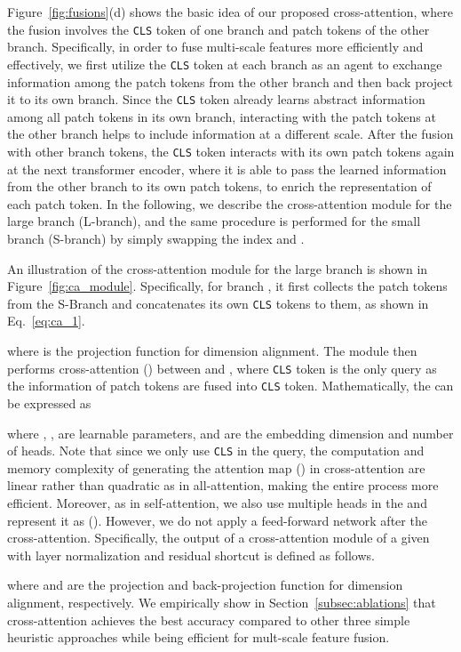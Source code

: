\documentclass[10pt,twocolumn,letterpaper]{article}
\def\clstoken{\texttt{CLS}\xspace}
\newcommand{\myparagraph}[1]{\vspace{1mm} \noindent {\textbf{#1}}}
\begin{document}
\myparagraph{Cross-Attention Fusion.}
Figure~\ref{fig:fusions}(d) shows the basic idea of our proposed cross-attention, where the fusion involves the \clstoken token of one branch and patch tokens of the other branch. 
Specifically, in order to fuse multi-scale features more efficiently and effectively, we first utilize the \clstoken token at each branch as an agent to exchange information among the patch tokens from the other branch and then back project it to its own branch. Since the \clstoken token already learns abstract information among all patch tokens in its own branch, interacting with the patch tokens at the other branch helps to include information at a different scale. After the fusion with other branch tokens, the \clstoken token interacts with its own patch tokens again at the next transformer encoder, where it is able to pass the learned information from the other branch to its own patch tokens, to enrich the representation of each patch token. In the following, we describe the cross-attention module for the large branch (L-branch), and the same procedure is performed for the small branch (S-branch) by simply swapping the index  and . 

An illustration of the cross-attention module for the large branch is shown in Figure~\ref{fig:ca_module}. 
Specifically, for branch , it first collects the patch tokens from the S-Branch and concatenates its own \clstoken tokens to them, as shown in Eq.~\ref{eq:ca_1}.



 
where  is the projection function for dimension alignment.
The module then performs cross-attention () between  and , where \clstoken token is the only query as the information of patch tokens are fused into \clstoken token. Mathematically, the  can be expressed as  



where , ,   are learnable parameters,  and  are the embedding dimension and number of heads.
Note that since we only use \clstoken in the query, the computation and memory complexity of generating the attention map () in cross-attention are linear rather than quadratic as in all-attention, making the entire process more efficient. Moreover, as in self-attention, we also use multiple heads in the  and represent it as (). However, we do not apply a feed-forward network  after the cross-attention. 
Specifically, the output  of a cross-attention module of a given  with layer normalization and residual shortcut is defined as follows.

where  and  are the projection and back-projection function for dimension alignment, respectively.
We empirically show in Section~\ref{subsec:ablations} that cross-attention achieves the best accuracy compared to other three simple heuristic approaches while being efficient for mult-scale feature fusion. 
\end{document}
